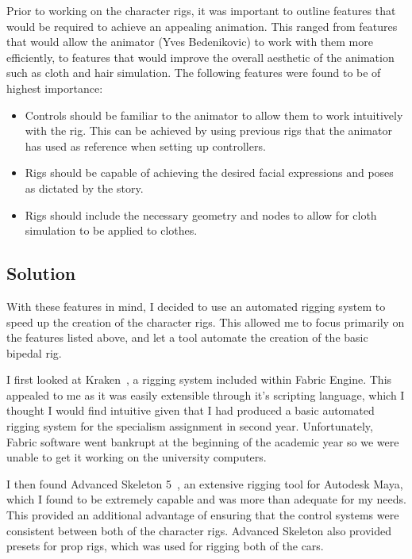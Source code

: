 \documentclass[11pt]{article}
\begin{document}
Prior to working on the character rigs, it was important to outline features that would be required to achieve an appealing animation. This ranged from features that would allow the animator (Yves Bedenikovic) to work with them more efficiently, to features that would improve the overall aesthetic of the animation such as cloth and hair simulation. The following features were found to be of highest importance:

\begin{itemize}

\item Controls should be familiar to the animator to allow them to work intuitively with the rig. This can be achieved by using previous rigs that the animator has used as reference when setting up controllers.

\item Rigs should be capable of achieving the desired facial expressions and poses as dictated by the story.

\item Rigs should include the necessary geometry and nodes to allow for cloth simulation to be applied to clothes.

\end{itemize}

\subsection{Solution}

With these features in mind, I decided to use an automated rigging system to speed up the creation of the character rigs. This allowed me to focus primarily on the features listed above, and let a tool automate the creation of the basic bipedal rig.

I first looked at Kraken~\cite{kraken}, a rigging system included within Fabric Engine. This appealed to me as it was easily extensible through it's scripting language, which I thought I would find intuitive given that I had produced a basic automated rigging system for the specialism assignment in second year. Unfortunately, Fabric software went bankrupt at the beginning of the academic year so we were unable to get it working on the university computers.

I then found Advanced Skeleton 5~\cite{advancedSkeleton}, an extensive rigging tool for Autodesk Maya, which I found to be extremely capable and was more than adequate for my needs. This provided an additional advantage of ensuring that the control systems were consistent between both of the character rigs. Advanced Skeleton also provided presets for prop rigs, which was used for rigging both of the cars.
\end{document}
